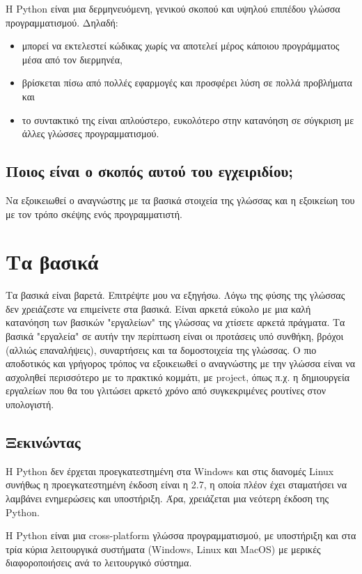 \documentclass[12pt]{extreport}
\begin{document}
Η Python είναι μια δερμηνευόμενη, γενικού σκοπού και υψηλού επιπέδου γλώσσα
προγραμματισμού. Δηλαδή:
\begin{itemize}
    \item μπορεί να εκτελεστεί κώδικας χωρίς να αποτελεί μέρος κάποιου προγράμματος μέσα από τον διερμηνέα,
    \item βρίσκεται πίσω από πολλές εφαρμογές και προσφέρει λύση σε πολλά
          προβλήματα και
    \item το συντακτικό της είναι απλούστερο, ευκολότερο στην κατανόηση σε
          σύγκριση με άλλες γλώσσες προγραμματισμού.
\end{itemize}

\section{Ποιος είναι ο σκοπός αυτού του εγχειριδίου;}

Να εξοικειωθεί ο αναγνώστης με τα βασικά στοιχεία της γλώσσας και η εξοικείωη του με τον τρόπο σκέψης ενός προγραμματιστή.

\chapter{Τα βασικά}

Τα βασικά είναι βαρετά. Επιτρέψτε μου να εξηγήσω. Λόγω της φύσης της γλώσσας δεν χρειάζεστε να επιμείνετε στα βασικά. Είναι αρκετά εύκολο με μια καλή κατανόηση των βασικών "εργαλείων" της γλώσσας να χτίσετε αρκετά πράγματα. Τα βασικά "εργαλεία" σε αυτήν την περίπτωση είναι οι προτάσεις υπό συνθήκη, βρόχοι (αλλιώς επαναλήψεις), συναρτήσεις και τα δομοστοιχεία της γλώσσας. Ο πιο αποδοτικός και γρήγορος τρόπος να εξοικειωθεί ο αναγνώστης με την γλώσσα είναι να ασχοληθεί περισσότερο με το πρακτικό κομμάτι, με project, όπως π.χ. η δημιουργεία εργαλείων που θα του γλιτώσει αρκετό χρόνο από συγκεκριμένες ρουτίνες στον υπολογιστή.

\newpage

\section{Ξεκινώντας}

Η Python δεν έρχεται προεγκατεστημένη στα Windows και στις διανομές Linux συνήθως η προεγκατεστημένη έκδοση είναι η 2.7, η οποία πλέον έχει σταματήσει να λαμβάνει ενημερώσεις και υποστήριξη. Άρα, χρειάζεται μια νεότερη έκδοση της  Python.

Η Python είναι μια cross-platform γλώσσα προγραμματισμού, με υποστήριξη και στα τρία κύρια λειτουργικά συστήματα (Windows, Linux και MacOS) με μερικές διαφοροποιήσεις ανά το λειτουργικό σύστημα.
\end{document}

